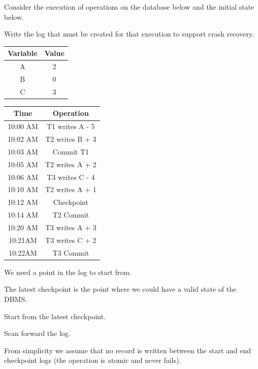 \documentclass{beamer}
\begin{document}
\begin{slide}{
	\item Consider the execution of operations on the database below and the initial state below.
	\item Write the log that must be created for that execution to support crash recovery.
	
	\begin{table}
		\tiny
		\begin{tabular}{|c|c|}
			\hline
			\textbf{Variable} & \textbf{Value} \\
			\hline
			A & 2\\
			\hline
			B & 0 \\
			\hline
			C & 3 \\
			\hline
		\end{tabular}
	\end{table}
	\begin{table}
		\tiny
		\begin{tabular}{|c|c|}
			\hline
			\textbf{Time} & \textbf{Operation} \\
			\hline
			10:00 AM & T1 writes A - 5 \\
			\hline
			10:02 AM & T2 writes B + 3 \\
			\hline
			10:03 AM & Commit T1 \\
			\hline
			10:05 AM & T2 writes A + 2\\
			\hline
			10:06 AM & T3 writes C - 4 \\
			\hline
			10:10 AM & T2 writes A + 1\\
			\hline
			10:12 AM & Checkpoint \\
			\hline
			10:14 AM & T2 Commit \\
			\hline
			10:20 AM & T3 writes A + 3 \\
			\hline
			10:21AM & T3 writes C + 2 \\
			\hline
			10:22AM & T3 Commit \\
			\hline
		\end{tabular}
	\end{table}
}\end{slide}

\begin{slide}{
	\item We need a point in the log to start from.
	\item The latest checkpoint is the point where we could have a valid state of the DBMS.
	\item Start from the latest checkpoint.
	\item Scan forward the log.
	\item From simplicity we assume that no record is written between the start and end checkpoint logs (the operation is atomic and never fails).
}\end{slide}
\end{document}
